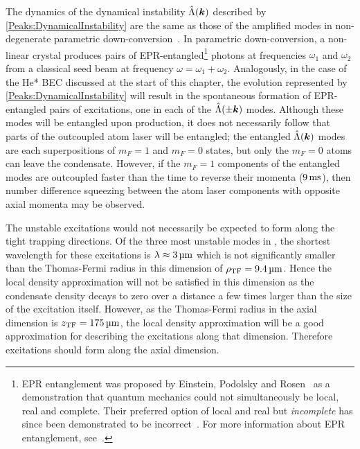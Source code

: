 The dynamics of the dynamical instability $\hat{\Lambda}(\bm{k})$ described by \eqref{Peaks:DynamicalInstability} are the same as those of the amplified modes in non-degenerate parametric down-conversion~\citep{WallsMilburn}.  In parametric down-conversion, a non-linear crystal produces pairs of EPR-entangled\footnote{EPR entanglement was proposed by Einstein, Podolsky and Rosen~\citep{Einstein:1935} as a demonstration that quantum mechanics could not simultaneously be local, real and complete.  Their preferred option of local and real but \emph{incomplete} has since been demonstrated to be incorrect~\citep{Aspect:1982uq}.  For more information about EPR entanglement, see~\citep[Chapter 18]{Scully}.} photons at frequencies $\omega_1$ and $\omega_2$ from a classical seed beam at frequency $\omega = \omega_1 + \omega_2$.  Analogously, in the case of the He* BEC discussed at the start of this chapter, the evolution represented by \eqref{Peaks:DynamicalInstability} will result in the spontaneous formation of EPR-entangled pairs of excitations, one in each of the $\hat{\Lambda}(\pm \bm{k})$ modes. Although these modes will be entangled upon production, it does not necessarily follow that parts of the outcoupled atom laser will be entangled; the entangled $\hat{\Lambda}(\bm{k})$ modes are each superpositions of $m_F=1$ and $m_F=0$ states, but only the $m_F=0$ atoms can leave the condensate. However, if the $m_F=1$ components of the entangled modes are outcoupled faster than the time to reverse their momenta ($\unit[9]{ms}$), then number difference squeezing between the atom laser components with opposite axial momenta may be observed.

The unstable excitations would not necessarily be expected to form along the tight trapping directions. Of the three most unstable modes in , the shortest wavelength for these excitations is $\lambda \approx \unit[3]{\micro m}$ which is not significantly smaller than the Thomas-Fermi radius in this dimension of $\rho_\text{TF} = \unit[9.4]{\micro m}$. Hence the local density approximation will not be satisfied in this dimension as the condensate density decays to zero over a distance a few times larger than the size of the excitation itself.  However, as the Thomas-Fermi radius in the axial dimension is $z_\text{TF} = \unit[175]{\micro m}$, the local density approximation will be a good approximation for describing the excitations along that dimension. Therefore excitations should form along the axial dimension.

